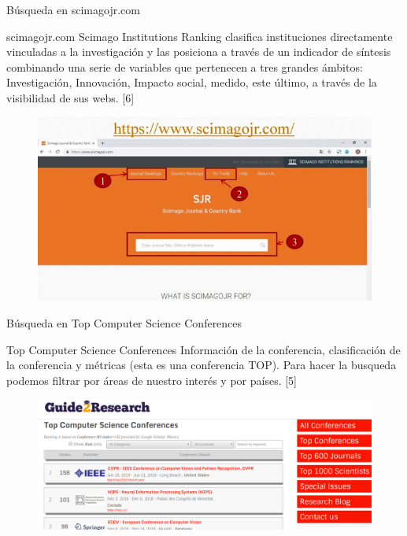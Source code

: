 \begin{frame}{Búsqueda en scimagojr.com}
\begin{block}{scimagojr.com}
Scimago Institutions Ranking clasifica instituciones directamente vinculadas a la investigación y las posiciona a través de un indicador de síntesis combinando una serie de variables que pertenecen a tres grandes ámbitos: Investigación, Innovación, Impacto social, medido, este último, a través de la visibilidad de sus webs. [6]
\end{block}   
\begin{figure}[H]
    \includegraphics[scale=0.4]{capitulos/webcite2.png}
    \label{fig:boat1}
\end{figure}
\end{frame}

\begin{frame}{Búsqueda en Top Computer Science Conferences}
\begin{block}{Top Computer Science Conferences}
Información de la conferencia, clasificación de la conferencia y métricas (esta es una conferencia TOP). Para hacer la busqueda podemos filtrar por áreas de nuestro interés y por países. [5]
\end{block}   
\begin{figure}[H]
    \includegraphics[scale=0.3]{capitulos/top.png}
    \label{fig:boat1}
\end{figure}
\end{frame}

